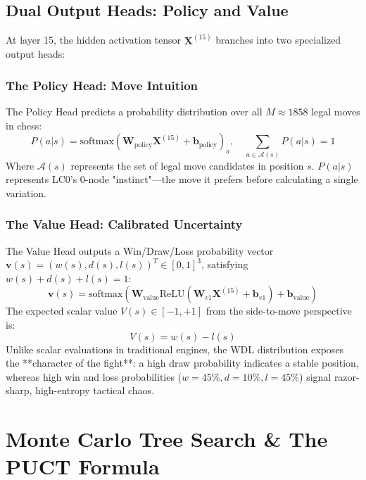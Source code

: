 \documentclass[11pt,a4paper]{report}
\begin{document}
\section{Dual Output Heads: Policy and Value}
At layer 15, the hidden activation tensor $\mathbf{X}^{(15)}$ branches into two specialized output heads:

\subsection{The Policy Head: Move Intuition}
The Policy Head predicts a probability distribution over all $M \approx 1858$ legal moves in chess:
\begin{equation}
P(a|s) = \text{softmax}\left( \mathbf{W}_{\text{policy}} \mathbf{X}^{(15)} + \mathbf{b}_{\text{policy}} \right)_a, \quad \sum_{a \in \mathcal{A}(s)} P(a|s) = 1
\end{equation}
Where $\mathcal{A}(s)$ represents the set of legal move candidates in position $s$. $P(a|s)$ represents LC0's 0-node "instinct"---the move it prefers before calculating a single variation.

\subsection{The Value Head: Calibrated Uncertainty}
The Value Head outputs a Win/Draw/Loss probability vector $\mathbf{v}(s) = (w(s), d(s), l(s))^T \in [0,1]^3$, satisfying $w(s) + d(s) + l(s) = 1$:
\begin{equation}
\mathbf{v}(s) = \text{softmax}\left( \mathbf{W}_{\text{value}} \text{ReLU}\left( \mathbf{W}_{v1} \mathbf{X}^{(15)} + \mathbf{b}_{v1} \right) + \mathbf{b}_{\text{value}} \right)
\end{equation}
The expected scalar value $V(s) \in [-1, +1]$ from the side-to-move perspective is:
\begin{equation}
V(s) = w(s) - l(s)
\end{equation}
Unlike scalar evaluations in traditional engines, the WDL distribution exposes the **character of the fight**: a high draw probability indicates a stable position, whereas high win and loss probabilities ($w=45\%, d=10\%, l=45\%$) signal razor-sharp, high-entropy tactical chaos.

\newpage
\chapter{Monte Carlo Tree Search \& The PUCT Formula}
\end{document}
